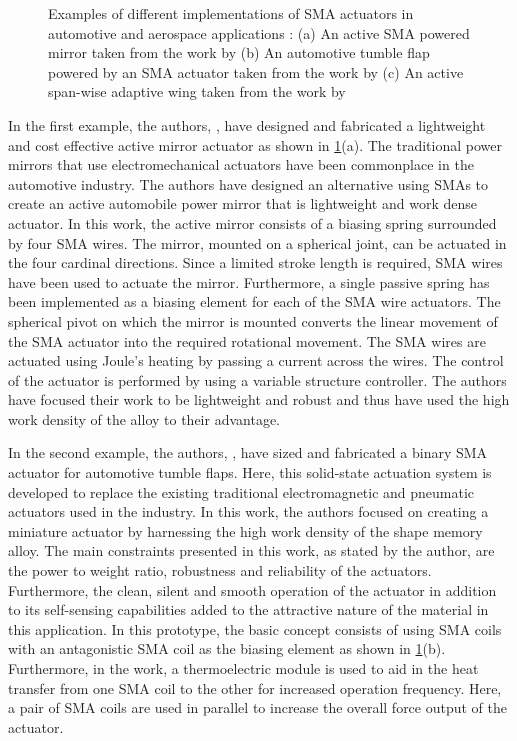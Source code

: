 \begin{figure}[hbt!]
    \centering
    
    \caption{Examples of different implementations of SMA actuators in automotive and aerospace applications : (a) An active SMA powered mirror taken from the work by \cite{williamsControlAutomotiveShape2010a} (b) An automotive tumble flap powered by an SMA actuator taken from the work by \cite{belliniMechatronicDesignShape2009} (c) An active span-wise adaptive wing taken from the work by \cite{belliniMechatronicDesignShape2009}}
    \label{fig:auto-examples}
\end{figure}

In the first example, the authors, \cite{williamsControlAutomotiveShape2010a}, have designed and fabricated a lightweight and cost effective active mirror actuator as shown in \cref{fig:auto-examples}(a). The traditional power mirrors that use electromechanical actuators have been commonplace in the automotive industry. The authors have designed an alternative using SMAs to create an active automobile power mirror that is lightweight and work dense actuator. In this work, the active mirror consists of a biasing spring surrounded by four SMA wires. The mirror, mounted on a spherical joint, can be actuated in the four cardinal directions. Since a limited stroke length is required, SMA wires have been used to actuate the mirror. Furthermore, a single passive spring has been implemented as a biasing element for each of the SMA wire actuators. The spherical pivot on which the mirror is mounted converts the linear movement of the SMA actuator into the required rotational movement. The SMA wires are actuated using Joule's heating by passing a current across the wires. The control of the actuator is performed by using a variable structure controller. The authors have focused their work to be lightweight and robust and thus have used the high work density of the alloy to their advantage.

In the second example, the authors, \cite{belliniMechatronicDesignShape2009}, have sized and fabricated a binary SMA actuator for automotive tumble flaps. Here, this solid-state actuation system is developed to replace the existing traditional electromagnetic and pneumatic actuators used in the industry. In this work, the authors focused on creating a miniature actuator by harnessing the high work density of the shape memory alloy. The main constraints presented in this work, as stated by the author, are the power to weight ratio, robustness and reliability of the actuators. Furthermore, the clean, silent and smooth operation of the actuator in addition to its self-sensing capabilities added to the attractive nature of the material in this application. In this prototype, the basic concept consists of using SMA coils with an antagonistic SMA coil as the biasing element as shown in \cref{fig:auto-examples}(b). Furthermore, in the work, a thermoelectric module is used to aid in the heat transfer from one SMA coil to the other for increased operation frequency. Here, a pair of SMA coils are used in parallel to increase the overall force output of the actuator.

